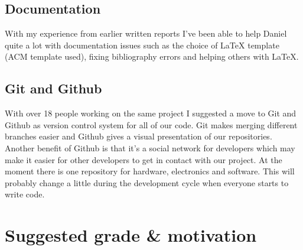 \subsection{Documentation}
With my experience from earlier written reports I've been able to help Daniel
quite a lot with documentation issues such as the choice of LaTeX template
(ACM template used), fixing bibliography errors and helping
others with LaTeX.

\subsection{Git and Github}
With over 18 people working on the same project I suggested a move to Git and
Github as version control system for all of our code. Git makes merging
different branches easier and Github gives a visual presentation of our
repositories. Another benefit of Github is that it's a social network for
developers which may make it easier for other developers to get in contact
with our project. At the moment there is one repository for hardware, electronics
and software. This will probably change a little during the development cycle
when everyone starts to write code.

\section{Suggested grade \& motivation}
